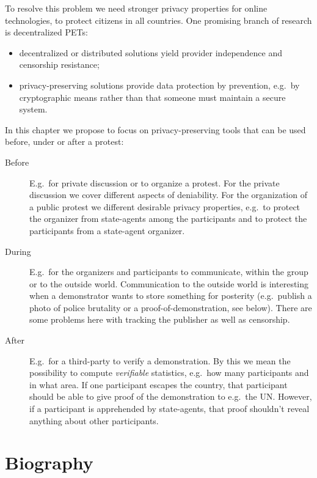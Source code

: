 \documentclass[a4paper]{llncs}
\begin{document}
To resolve this problem we need stronger privacy properties for online 
technologies, to protect citizens in all countries.
One promising branch of research is decentralized \acp{PET}:
\begin{itemize}
  \item decentralized or distributed solutions yield provider independence and 
    censorship resistance;
  \item privacy-preserving solutions provide data protection by prevention, 
    e.g.\ by cryptographic means rather than that someone must maintain 
    a secure system.
\end{itemize}
In this chapter we propose to focus on privacy-preserving tools that can be 
used before, under or after a protest:
\begin{description}

  \item[Before] E.g.\ for private discussion or to organize 
    a protest.
    For the private discussion we cover different aspects of deniability.
    For the organization of a public protest we different desirable privacy 
    properties, e.g.\ to protect the organizer from state-agents among the 
    participants and to protect the participants from a state-agent organizer.

  \item[During] E.g.\ for the organizers and participants to communicate, 
    within the group or to the outside world.
    Communication to the outside world is interesting when a demonstrator wants 
    to store something for posterity (e.g.\ publish a photo of police brutality 
    or a proof-of-demonstration, see below).
    There are some problems here with tracking the publisher as well as 
    censorship.

  \item[After] E.g.\ for a third-party to verify a demonstration.
    By this we mean the possibility to compute \emph{verifiable} statistics, 
    e.g.\ how many participants and in what area.
    If one participant escapes the country, that participant should be able to 
    give proof of the demonstration to e.g.\ the UN\@.
    However, if a participant is apprehended by state-agents, that proof 
    shouldn't reveal anything about other participants.

\end{description}


\printbibliography{}


\appendix
\section{Biography}
\label{Biography}
\end{document}
